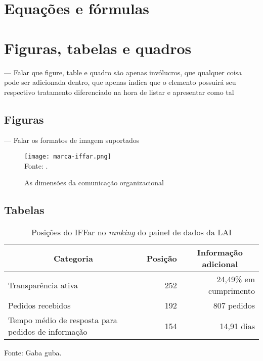 \section{Equações e fórmulas}

\section{Figuras, tabelas e quadros}
  --- Falar que figure, table e quadro são apenas invólucros, que qualquer coisa pode ser adicionada dentro, que apenas indica que o elemento possuirá seu respectivo tratamento diferenciado na hora de listar e apresentar como tal
  
\subsection{Figuras}
  --- Falar os formatos de imagem suportados
  \begin{figure}[H]
    \Centering\singlespacing
    \caption{As dimensões da comunicação organizacional}
    \label{figura:marca-iffar}
    \texttt{[image: marca-iffar.png]}\\
    \footnotesize
    Fonte: \textcite{iffar-identidade-visual-2021}.
  \end{figure}
  
\subsection{Tabelas}
\begin{table}[H]
  \Centering\singlespacing

  \caption{Posições do IFFar no \textit{ranking} do painel de dados da LAI}
  \label{tabela:cgu-iffar}
  \begin{tabularx}{12cm}
    {X r r} %
    \hline
    \multicolumn{1}{c}{\textbf{Categoria}}    &   
    \multicolumn{1}{c}{\textbf{Posição}}  & 
    \multicolumn{1}{c}{\textbf{Informação adicional}} \\
    \hline

    Transparência ativa &
    252\textordmasculine{} &
    24,49\% em cumprimento \\

    Pedidos recebidos &
    192\textordmasculine{} &
    807 pedidos \\

    Tempo médio de resposta para pedidos de informação       &   
    154\textordmasculine{} &
    14,91 dias \\
    \hline

  \end{tabularx}

\hspace{\fill}

\footnotesize

Fonte: Gaba guba.
\end{table}

